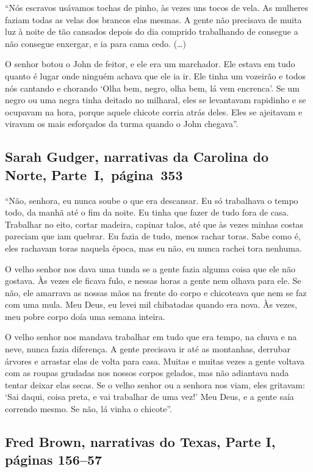 ``Nós escravos usávamos tochas de pinho, às vezes uns tocos de vela. As
mulheres faziam todas as velas dos brancos elas mesmas. A gente não
precisava de muita luz à noite de tão cansados depois do dia comprido
trabalhando de consegue a não consegue enxergar, e ia para cama cedo.
(\ldots{})

O senhor botou o John de feitor, e ele era um marchador. Ele estava em
tudo quanto é lugar onde ninguém achava que ele ia ir. Ele tinha um
vozeirão e todos nós cantando e chorando `Olha bem, negro, olha bem, lá
vem encrenca'. Se um negro ou uma negra tinha deitado no milharal, eles
se levantavam rapidinho e se ocupavam na hora, porque aquele chicote
corria atrás deles. Eles se ajeitavam e viravam os mais esforçados da
turma quando o John chegava''.

\subsection{Sarah Gudger, narrativas da Carolina do Norte, Parte~I,~página~353}
\label{ref114}

``Não, senhora, eu nunca soube o que era descansar. Eu só trabalhava o
tempo todo, da manhã até o fim da noite. Eu tinha que fazer de tudo fora
de casa. Trabalhar no eito, cortar madeira, capinar talos, até que às
vezes minhas costas pareciam que iam quebrar. Eu fazia de tudo, menos
rachar toras. Sabe como é, eles rachavam toras naquela época, mas eu
não, eu nunca rachei tora nenhuma.

O velho senhor nos dava uma tunda se a gente fazia alguma coisa que ele
não gostava. Às vezes ele ficava fulo, e nessas horas a gente nem olhava
para ele. Se não, ele amarrava as nossas mãos na frente do corpo e
chicoteava que nem se faz com uma mula. Meu Deus, eu levei mil
chibatadas quando era nova. Às vezes, meu pobre corpo doía uma semana
inteira.

O velho senhor nos mandava trabalhar em tudo que era tempo, na chuva e
na neve, nunca fazia diferença. A gente precisava ir até as montanhas,
derrubar árvores e arrastar elas de volta para casa. Muitas e muitas
vezes a gente voltava com as roupas grudadas nos nossos corpos gelados,
mas não adiantava nada tentar deixar elas secas. Se o velho senhor ou a
senhora nos viam, eles gritavam: `Sai daqui, coisa preta, e vai
trabalhar de uma vez!' Meu Deus, e a gente saía correndo mesmo. Se não,
lá vinha o chicote''.

\subsection{Fred Brown, narrativas do Texas, Parte I, páginas 156--57} \label{ref35}

